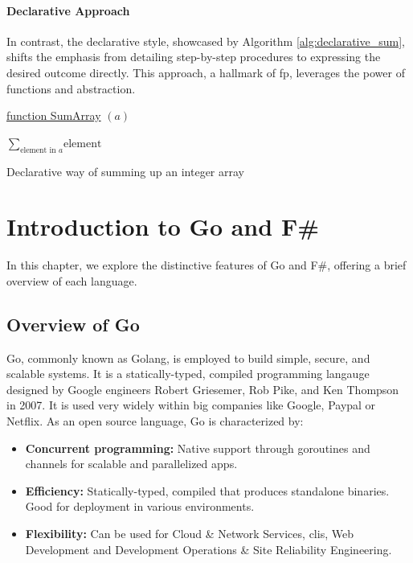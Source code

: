 \subsubsection{Declarative Approach}

In contrast, the declarative style, showcased by Algorithm \ref{alg:declarative_sum}, shifts the emphasis from detailing step-by-step procedures to expressing the desired outcome directly. This approach, a hallmark of \ac{fp}, leverages the power of functions and abstraction.

\begin{algorithm}

    \underline{function SumArray} $(a)$\;
    
    \BlankLine
    \Return $\sum_{\text{element in } a} \text{element}$
    
    \caption{Declarative way of summing up an integer array}
    \label{alg:declarative_sum}
\end{algorithm}

\chapter{Introduction to Go and F\#}\label{chap:language-comparison}
In this chapter, we explore the distinctive features of Go and F\#, offering a brief overview of each language.

    \section{Overview of Go}\label{sec:go-overview}
    Go, commonly known as Golang, is employed to build simple, secure, and scalable systems. It is a statically-typed, compiled programming langauge designed by Google engineers Robert Griesemer, Rob Pike, and Ken Thompson in 2007. It is used very widely within big companies like Google, Paypal or Netflix. As an open source language, Go is characterized by: 
    \begin{itemize}
        \item \textbf{Concurrent programming:}  Native support through goroutines and channels for scalable and parallelized \ac{app}s.
        \item \textbf{Efficiency:} Statically-typed, compiled that produces standalone binaries. Good for deployment in various environments.
        \item \textbf{Flexibility:} Can be used for Cloud \& Network Services, \ac{cli}s, Web Development and Development Operations \& Site Reliability Engineering.
    \end{itemize}
    \cite{GoWebsite}


